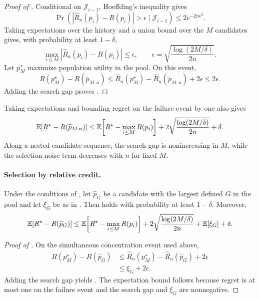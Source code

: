 \begin{proof}[Proof of ]
Conditional on $\mathcal J_{i-1}$, Hoeffding's inequality gives
\[
\Pr\!\left(
|\widehat R_n(p_i)-R(p_i)|>\epsilon
\mid\mathcal J_{i-1}\right)\le2e^{-2n\epsilon^2}.
\]
Taking expectations over the history and a union bound over the $M$
candidates gives, with probability at least $1-\delta$,
\[
\max_{i\le M}|\widehat R_n(p_i)-R(p_i)|\le\epsilon,
\qquad \epsilon=\sqrt{\frac{\log(2M/\delta)}{2n}}.
\]
Let $p_M^\star$ maximize population utility in the pool.  On this event,
\[
R(p_M^\star)-R(\widetilde p_{M,n})
\le\widehat R_n(p_M^\star)-\widehat R_n(\widetilde p_{M,n})
+2\epsilon\le2\epsilon.
\]
Adding the search gap proves .
\end{proof}

Taking expectations and bounding regret on the failure event by one also
gives
\[
\mathbb{E}\!\left[R^\star-R(\widetilde p_{M,n})\right]
\le\mathbb{E}\!\left[R^\star-\max_{i\le M}R(p_i)\right]
+2\sqrt{\frac{\log(2M/\delta)}{2n}}+\delta.
\]
Along a nested candidate sequence, the search gap is nonincreasing in $M$, while
the selection-noise term decreases with $n$ for fixed $M$.

\paragraph{Selection by relative credit.}
\begin{corollary}
\label{cor:g_selection}
Under the conditions of , let
$\widehat p_G$ be a candidate with the largest defined $G$ in the pool and
let $\xi_G$ be as in .  Then
 holds with probability at least $1-\delta$.
Moreover,
\[
\mathbb{E}\!\left[R^\star-R(\widehat p_G)\right]
\le\mathbb{E}\!\left[R^\star-\max_{i\le M}R(p_i)\right]
+2\sqrt{\frac{\log(2M/\delta)}{2n}}+\mathbb{E}[\xi_G]+\delta.
\]
\end{corollary}

\begin{proof}[Proof of ]
On the simultaneous concentration event used above,
\[
\begin{aligned}
R(p_M^\star)-R(\widehat p_G)
&\le\widehat R_n(p_M^\star)-\widehat R_n(\widehat p_G)+2\epsilon\\
&\le\xi_G+2\epsilon.
\end{aligned}
\]
Adding the search gap yields .  The expectation
bound follows because regret is at most one on the failure event and the
search gap and $\xi_G$ are nonnegative.
\end{proof}

